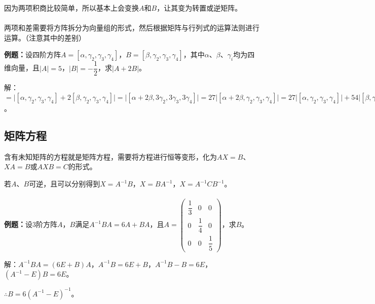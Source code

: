 因为两项积商比较简单，所以基本上会变换$A$和$B$，让其变为转置或逆矩阵。

\paragraph{}

两项和差需要将方阵拆分为向量组的形式，然后根据矩阵与行列式的运算法则进行运算。（注意其中的差别）

\textbf{例题：}设四阶方阵$A=[\alpha,\gamma_2,\gamma_3,\gamma_4]$，$B=[\beta,\gamma_2,\gamma_3,\gamma_4]$，其中$\alpha$、$\beta$、$\gamma_i$均为四维向量，且$\vert A\vert=5$，$\vert B\vert=-\dfrac{1}{2}$，求$\vert A+2B\vert$。

解：$=\vert[\alpha,\gamma_2,\gamma_3,\gamma_4]+2[\beta,\gamma_2,\gamma_3,\gamma_4]\vert=\vert[\alpha+2\beta,3\gamma_2,3\gamma_3,3\gamma_4]\vert=27\vert[\alpha+2\beta,\gamma_2,\gamma_3,\gamma_4]\vert=27\vert[\alpha,\gamma_2,\gamma_3,\gamma_4]\vert+54\vert[\beta,\gamma_2,\gamma_3,\gamma_4]\vert=27(\vert A\vert+2\vert B\vert)=108$。

\subsection{矩阵方程}

含有未知矩阵的方程就是矩阵方程，需要将方程进行恒等变形，化为$AX=B$、$XA=B$或$AXB=C$的形式。

若$A$、$B$可逆，且可以分别得到$X=A^{-1}B$，$X=BA^{-1}$，$X=A^{-1}CB^{-1}$。

\paragraph{}

\textbf{例题：}设3阶方阵$A$，$B$满足$A^{-1}BA=6A+BA$，且$A=\left(\begin{array}{ccc}
    \dfrac{1}{3} & 0 & 0 \\
    0 & \dfrac{1}{4} & 0 \\
    0 & 0 & \dfrac{1}{5}
\end{array}\right)$，求$B$。

解：$A^{-1}BA=(6E+B)A$，$A^{-1}B=6E+B$，$A^{-1}B-B=6E$，$(A^{-1}-E)B=6E$。

$\therefore B=6(A^{-1}-E)^{-1}$。

\paragraph{}

